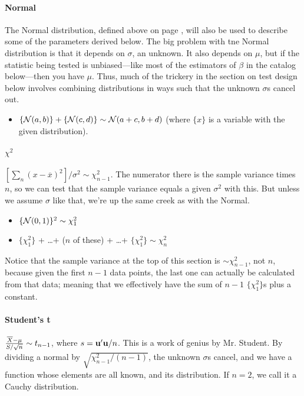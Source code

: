 \paragraph{Normal} 

The Normal distribution, defined above on page \pageref{normal},
will also be used to describe some of the parameters derived below.
The big problem with tne Normal distribution is that it depends on $\sigma$, an
unknown. It also depends on $\mu$, but if the statistic
being tested is unbiased---like most of the estimators of $\beta$ in the
catalog below---then you have $\mu$. Thus, much of the trickery in the
section on test design below involves combining distributions in ways
such that the unknown $\sigma$s cancel out.

\begin{itemize}
\item $\{{\cal N} (a,b)\} + \{{\cal N} (c,d)\} \sim {\cal N}
(a+c,b+d)$ (where $\{x\}$ is a variable with the given distribution).
\end{itemize}

\paragraph{$\chi^2$} $[\sum_n (x-\overline
x)^2]/\sigma^2\sim \chi^2_{n-1}$. The numerator there is the sample
variance times $n$, so we can test that the sample variance equals a
given $\sigma^2$ with this. But unless we assume $\sigma$ like that,
we're up the same creek as with the Normal.

\begin{itemize}
\item $\{{\cal N} (0,1)\}^2 \sim \chi^2_1$

\item $\{\chi^2_1\}$ + \dots + ($n$ of these) + \dots + $\{\chi^2_1\} \sim \chi^2_n$

\end{itemize}			\label{chisq}

Notice that the sample variance at the top of this section is $\sim
\chi^2_{n-1}$, not $n$, because given the first $n-1$ data points, the
last one can actually be calculated from that data; meaning that we
effectively have the sum of $n-1$ $\{\chi^2_1\}$s plus a constant.

\paragraph{Student's t}  ${\overline X - \mu \over S/\sqrt{n}}\sim
t_{n-1}$, where $s={\bf u}'{\bf u}/n$. This is a work of genius by Mr. Student.
By dividing a normal by $\sqrt{\chi^2_{n-1}/(n-1)}$, the unknown
$\sigma$s cancel, and we have a function whose elements are all known,
and its distribution.  If $n=2$, we call it a Cauchy distribution.
\label{tstat}


